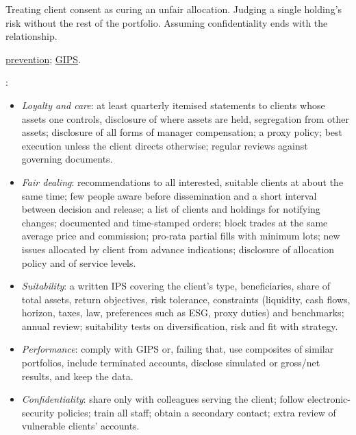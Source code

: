 \begin{qfrule}
 Treating client consent as curing an unfair allocation. Judging a single holding's risk without the rest of the portfolio. Assuming confidentiality ends with the relationship.

 \hyperref[meth:preventing-client-duty-violations]{prevention}; \hyperref[meth:gips-composite-presentation]{GIPS}.

\end{qfrule}

\begin{qfmethod}\label{meth:preventing-client-duty-violations}
 \citep[pp.~70--71, 77--80, 90, 95--96, 102--103, 165]{standards-practice-handbook-2024}:
\begin{itemize}
\item \emph{Loyalty and care}: at least quarterly itemised statements to clients whose assets one controls, disclosure of where assets are held, segregation from other assets; disclosure of all forms of manager compensation; a proxy policy; best execution unless the client directs otherwise; regular reviews against governing documents.
\item \emph{Fair dealing}: recommendations to all interested, suitable clients at about the same time; few people aware before dissemination and a short interval between decision and release; a list of clients and holdings for notifying changes; documented and time-stamped orders; block trades at the same average price and commission; pro-rata partial fills with minimum lots; new issues allocated by client from advance indications; disclosure of allocation policy and of service levels.
\item \emph{Suitability}: a written IPS covering the client's type, beneficiaries, share of total assets, return objectives, risk tolerance, constraints (liquidity, cash flows, horizon, taxes, law, preferences such as ESG, proxy duties) and benchmarks; annual review; suitability tests on diversification, risk and fit with strategy.
\item \emph{Performance}: comply with GIPS or, failing that, use composites of similar portfolios, include terminated accounts, disclose simulated or gross/net results, and keep the data.
\item \emph{Confidentiality}: share only with colleagues serving the client; follow electronic-security policies; train all staff; obtain a secondary contact; extra review of vulnerable clients' accounts.
\end{itemize}


\end{qfmethod}
